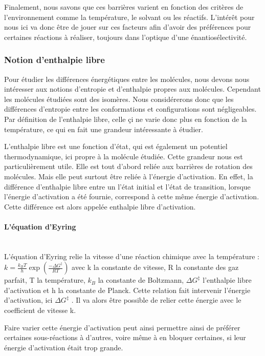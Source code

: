 \documentclass{article}
\newcommand{\pparagraph}[1]{\paragraph{#1}\mbox{}\\}
\begin{document}
Finalement, nous savons que ces barrières varient en fonction des critères de l'environnement comme la température, le solvant ou les réactifs. L’intérêt pour nous ici va donc être de jouer sur ces facteurs afin d’avoir des préférences pour certaines réactions à réaliser, toujours dans l’optique d’une énantiosélectivité.
\medbreak

\subsubsection{Notion d'enthalpie libre}

Pour étudier les différences énergétiques entre les molécules, nous devons nous intéresser aux notions d’entropie et d’enthalpie propres aux molécules. Cependant les molécules étudiées sont des isomères. Nous considérerons donc que les différences d’entropie entre les conformations et configurations sont négligeables. Par définition de l'enthalpie libre, celle çi ne varie donc plus en fonction de la température, ce qui en fait une grandeur intéressante à étudier.

L'enthalpie libre est une fonction d'état, qui est également un potentiel thermodynamique, ici propre à la molécule étudiée. Cette grandeur nous est particulièrement utile. Elle est tout d’abord reliée aux barrières de rotation des molécules. Mais elle peut surtout être reliée à l’énergie d’activation. En effet, la différence d’enthalpie libre entre un l’état initial et l’état de transition, lorsque l’énergie d’activation a été fournie, correspond à cette même énergie d’activation. Cette différence est alors appelée enthalpie libre d’activation.



\pparagraph{L'équation d’Eyring}


L’équation d’Eyring relie la vitesse d’une réaction chimique avec la température :
$k=\frac{k_BT}{h}\exp{(\frac{-\Delta G^{\ddagger}}{RT})}$ avec k la constante de vitesse, R la constante des gaz parfait, T la température, $k_B$ la constante de Boltzmann, $\Delta G^{\ddagger}$ l’enthalpie libre d’activation et h la constante de Planck. Cette relation fait intervenir l’énergie d’activation, ici $\Delta G^{\ddagger}$ . Il va alors être possible de relier cette énergie avec le coefficient de vitesse k.
\medbreak

Faire varier cette énergie d'activation peut ainsi permettre ainsi de préférer certaines sous-réactions à d'autres, voire même à en bloquer certaines, si leur énergie d'activation était trop grande.
\end{document}
